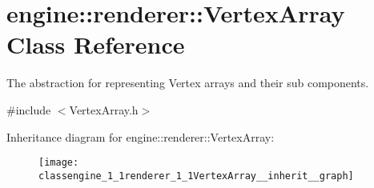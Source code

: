 \hypertarget{classengine_1_1renderer_1_1VertexArray}{}\section{engine\+:\+:renderer\+:\+:Vertex\+Array Class Reference}
\label{classengine_1_1renderer_1_1VertexArray}


The abstraction for representing Vertex arrays and their sub components.  




{\ttfamily \#include $<$Vertex\+Array.\+h$>$}



Inheritance diagram for engine\+:\+:renderer\+:\+:Vertex\+Array\+:
\nopagebreak
\begin{figure}[H]
\begin{center}
\leavevmode
\texttt{[image: classengine\_1\_1renderer\_1\_1VertexArray\_\_inherit\_\_graph]}
\end{center}
\end{figure}
